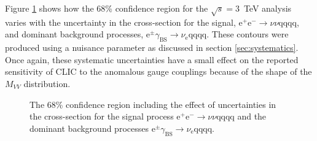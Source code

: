 Figure \ref{fig:nuisance3000GeV} shows how the 68\% confidence region for the $\sqrt{s}=3$~TeV analysis varies with the uncertainty in the cross-section for the signal, $\text{e}^{+}\text{e}^{-} \rightarrow \nu{\nu}\text{qqqq}$, and dominant background processes, $\text{e}^{\pm}\gamma_{\text{BS}} \rightarrow \nu_{\text{e}}\text{qqqq}$.  These contours were produced using a nuisance parameter as discussed in section \ref{sec:systematics}.  Once again, these systematic uncertainties have a small effect on the reported sensitivity of CLIC to the anomalous gauge couplings because of the shape of the $M_{VV}$ distribution.

\begin{figure}[h!]
\centering
{}\hfill
{}
\caption[The 68\% confidence region including the effect of uncertainties in the cross-section for \protect{} the signal process $\text{e}^{+}\text{e}^{-} \rightarrow \nu{\nu}\text{qqqq}$ and \protect{} the dominant background processes $\text{e}^{\pm}\gamma_{\text{BS}} \rightarrow \nu_{\text{e}}\text{qqqq}$.]{The 68\% confidence region including the effect of uncertainties in the cross-section for \protect{} the signal process $\text{e}^{+}\text{e}^{-} \rightarrow \nu{\nu}\text{qqqq}$ and \protect{} the dominant background processes $\text{e}^{\pm}\gamma_{\text{BS}} \rightarrow \nu_{\text{e}}\text{qqqq}$.}
\label{fig:nuisance3000GeV}
\end{figure}

